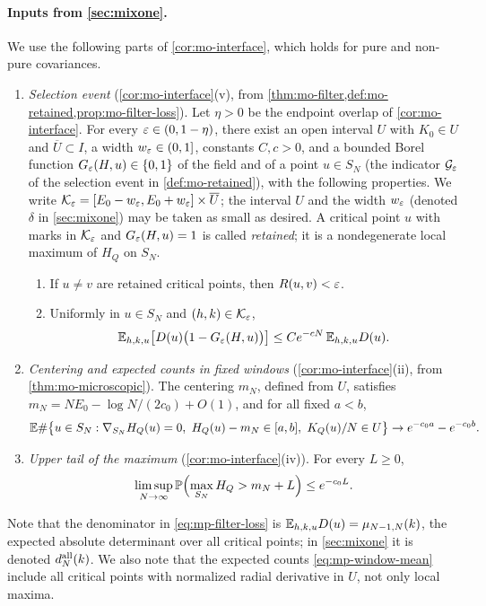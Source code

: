 \paragraph{Inputs from \cref{sec:mixone}.}
We use the following parts of \cref{cor:mo-interface}, which holds for pure and non-pure covariances.
\begin{enumerate}[label=(M\arabic*)]
\item\label{it:mp-M1} \emph{Selection event} (\cref{cor:mo-interface}(v), from \cref{thm:mo-filter,def:mo-retained,prop:mo-filter-loss}). Let $\eta>0$ be the endpoint overlap of \cref{cor:mo-interface}. For every $\varepsilon\in(0,1-\eta)$, there exist an open interval $U$ with $K_0\in U$ and $\overline U\subset I$, a width $w_\varepsilon\in(0,1]$, constants $C,c>0$, and a bounded Borel function $G_\varepsilon(H,u)\in\{0,1\}$ of the field and of a point $u\in S_N$ (the indicator $\mathcal G_\varepsilon$ of the selection event in \cref{def:mo-retained}), with the following properties. We write $\mathcal K_\varepsilon=[E_0-w_\varepsilon,E_0+w_\varepsilon]\times\overline U$; the interval $U$ and the width $w_\varepsilon$ (denoted $\delta$ in \cref{sec:mixone}) may be taken as small as desired. A critical point $u$ with marks in $\mathcal K_\varepsilon$ and $G_\varepsilon(H,u)=1$ is called \emph{retained}; it is a nondegenerate local maximum of $H_Q$ on $S_N$.
\begin{enumerate}[label=(\roman*)]
\item If $u\ne v$ are retained critical points, then $R(u,v)<\varepsilon$.
\item Uniformly in $u\in S_N$ and $(h,k)\in\mathcal K_\varepsilon$,
\begin{equation}\label{eq:mp-filter-loss}
\mathbb E_{h,k,u}\bigl[D(u)\bigl(1-G_\varepsilon(H,u)\bigr)\bigr]\le Ce^{-cN}\,\mathbb E_{h,k,u}D(u).
\end{equation}
\end{enumerate}
\item\label{it:mp-M2} \emph{Centering and expected counts in fixed windows} (\cref{cor:mo-interface}(ii), from \cref{thm:mo-microscopic}). The centering $m_N$, defined from $U$, satisfies $m_N=NE_0-\log N/(2c_0)+O(1)$, and for all fixed $a<b$,
\begin{equation}\label{eq:mp-window-mean}
\E\#\bigl\{u\in S_N:\nabla_{S_N}H_Q(u)=0,\ H_Q(u)-m_N\in[a,b],\ K_Q(u)/N\in U\bigr\}\to e^{-c_0a}-e^{-c_0b}.
\end{equation}
\item\label{it:mp-M3} \emph{Upper tail of the maximum} (\cref{cor:mo-interface}(iv)). For every $L\ge0$,
\begin{equation}\label{eq:mp-upper-tail}
\limsup_{N\to\infty}\mathbb P\Bigl(\max_{S_N}H_Q>m_N+L\Bigr)\le e^{-c_0L}.
\end{equation}
\end{enumerate}
Note that the denominator in \eqref{eq:mp-filter-loss} is $\mathbb E_{h,k,u}D(u)=\mu_{N-1,N}(k)$, the expected absolute determinant over all critical points; in \cref{sec:mixone} it is denoted $d_N^{\rm all}(k)$. We also note that the expected counts \eqref{eq:mp-window-mean} include all critical points with normalized radial derivative in $U$, not only local maxima.


